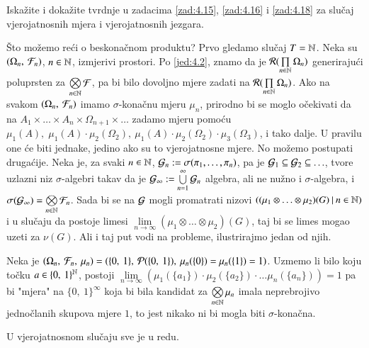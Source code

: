 \begin{zad} \label{zad:4.19}
    Iska\v zite i doka\v zite tvrdnje u zadacima \ref{zad:4.15}, \ref{zad:4.16} i \ref{zad:4.18} za slu\v caj vjerojatnosnih mjera i vjerojatnosnih jezgara.
\end{zad}

\v Sto mo\v zemo re\' ci o beskona\v cnom produktu?
Prvo gledamo slu\v caj $T = \mathbb{N}$. Neka su $({\Omega_n}, \: {\mathcal{F}_n})$, $n \in \mathbb{N}$, izmjerivi prostori. Po \eqref{jed:4.2}, znamo da je $\mathcal{R}({\prod\limits_{n \in \mathbb{N}}^{} \Omega_n})$ generiraju\' ci poluprsten za $\bigotimes\limits_{n \in \mathbb{N}}^{} \mathcal{F}$, pa bi bilo dovoljno mjere zadati na $\mathcal{R}({\prod\limits_{n \in \mathbb{N}}^{} \Omega_n})$.
Ako na svakom $({\Omega_n}, \: {\mathcal{F}_n})$ imamo $\sigma$-kona\v cnu mjeru $\mu_n$, prirodno bi se moglo o\v cekivati da na $A_1 \times \ldots \times A_n \times \Omega_{n + 1} \times \ldots$ zadamo mjeru pomo\' cu $\mu_1(A), \; \mu_1(A) \cdot \mu_2(\Omega_2), \: \mu_1(A) \cdot \mu_2(\Omega_2) \cdot \mu_3 (\Omega_3)$, i tako dalje.
U pravilu one \' ce biti jednake, jedino ako su to vjerojatnosne mjere.
No mo\v zemo postupati druga\' cije.
Neka je, za svaki $n \in \mathbb{N}$, $\mathcal{G}_n := \sigma({\pi_1, \ldots, \pi_n})$, pa je $\mathcal{G}_1 \subseteq \mathcal{G}_2 \subseteq \ldots$, tvore uzlazni niz $\sigma$-algebri takav da je $\mathcal{G}_{\infty} := \bigcup\limits_{n = 1}^{\infty} \mathcal{G}_n$ algebra, ali ne nu\v zno i $\sigma$-algebra, i $\sigma({\mathcal{G}_{\infty}}) = \bigotimes\limits_{n \in \mathbb{N}}^{} \mathcal{F}_n$.
Sada bi se na $\mathcal{G}$ mogli promatrati nizovi $({(\mu_1 \otimes \ldots \otimes \mu_2)(G)} \: | \: {n \in \mathbb{N}})$ i u slu\v caju da postoje limesi $\lim\limits_{n \to \infty} (\mu_1 \otimes \ldots \otimes \mu_2)(G)$, taj bi se limes mogao uzeti za $\nu (G)$.
Ali i taj put vodi na probleme, ilustrirajmo jedan od njih.

\begin{pr}  \label{pr:4.20}
    Neka je $(\Omega_n, \: \mathcal{F}_n, \: \mu_n) = (\{0, \: 1\}, \: \mathcal{P}({\{0, \: 1\}}), \: \mu_n(\{0\}) = \mu_n (\{1\}) = 1)$.
    Uzmemo li bilo koju to\v cku $a \in \{ 0, \: 1 \}^{\mathbb{N}}$, postoji $\lim\limits_{n \to \infty} (\mu_1 (\{ a_1 \}) \cdot \mu_2 (\{ a_2 \}) \cdot \dots \mu_n (\{ a_n \}) ) = 1$ pa bi "mjera" na $\{ 0, \: 1 \}^{\infty}$ koja bi bila kandidat za $\bigotimes\limits_{n \in \mathbb{N}}^{} \mu_n$ imala neprebrojivo jedno\v clanih skupova mjere $1$, to jest nikako ni bi mogla biti $\sigma$-kona\v cna. 
\end{pr}

U vjerojatnosnom slu\v caju sve je u redu.


